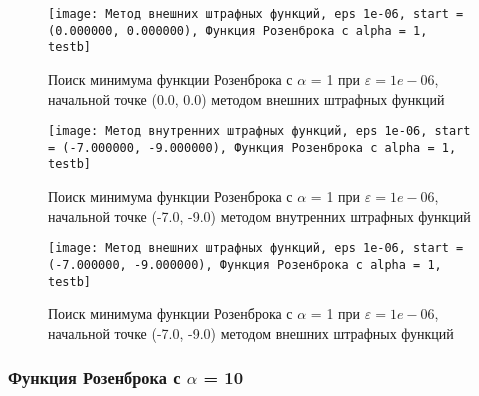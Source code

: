             \begin{figure}[H]
	        \centering
	        \texttt{[image: Метод внешних штрафных функций, eps 1e-06, start = (0.000000, 0.000000), Функция Розенброка с alpha = 1, testb]}%
	        \caption{Поиск минимума функции Розенброка с $\alpha$ = 1 при $\varepsilon = 1e-06$, начальной точке (0.0, 0.0) методом внешних штрафных функций}
	        \vspace*{-1.2cm}
            \end{figure}
            
            \begin{figure}[H]
	        \centering
	        \texttt{[image: Метод внутренних штрафных функций, eps 1e-06, start = (-7.000000, -9.000000), Функция Розенброка с alpha = 1, testb]}%
	        \caption{Поиск минимума функции Розенброка с $\alpha$ = 1 при $\varepsilon = 1e-06$, начальной точке (-7.0, -9.0) методом внутренних штрафных функций}
	        \vspace*{-1.2cm}
            \end{figure}
            
            \begin{figure}[H]
	        \centering
	        \texttt{[image: Метод внешних штрафных функций, eps 1e-06, start = (-7.000000, -9.000000), Функция Розенброка с alpha = 1, testb]}%
	        \caption{Поиск минимума функции Розенброка с $\alpha$ = 1 при $\varepsilon = 1e-06$, начальной точке (-7.0, -9.0) методом внешних штрафных функций}
	        \vspace*{-1.2cm}
            \end{figure}
            \subsubsection{Функция Розенброка с $\alpha$ = 10}

